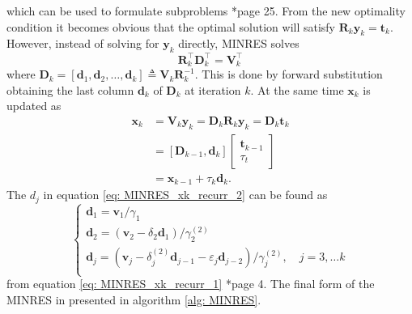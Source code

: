 which can be used to formulate subproblems \cite{ChoiSou-ChengTerrya2007Imfs}*{page 25}. From the new optimality condition it becomes obvious that the optimal solution will satisfy $\bm{R}_k \bm{y}_k = \bm{t}_k$. However, instead of solving for $\bm{y}_k$ directly, MINRES solves
\begin{equation}\label{eq: MINRES_xk_recurr_1}
    \bm{R}_{k}^{\intercal} \bm{D}_{k}^{\intercal} = \bm{V}_{k}^{\intercal}
\end{equation}
where $\bm{D}_{k} =
    \left[ \bm{d}_1 , \bm{d}_2 , \ldots , \bm{d}_k \right] \triangleq \bm{V}_k \bm{R}_k^{-1}$. This is done by forward substitution obtaining the last column $\bm{d}_k$ of $\bm{D}_k$ at iteration $k$. At the same time $\bm{x}_k$ is updated as
\begin{align} \label{eq: MINRES_xk_recurr_2}
    \bm{x}_k & = \bm{V}_k \bm{y}_k = \bm{D}_k \bm{R}_k \bm{y}_k = \bm{D}_k \bm{t}_k \nonumber \\
             & = \left[ \bm{D}_{k-1} , \bm{d}_k \right]
    \begin{bmatrix}
        \bm{t}_{k-1} \\ \tau_{t}
    \end{bmatrix} \nonumber                                                      \\
             & = \bm{x}_{k-1} + \tau_{k} \bm{d}_{k}.
\end{align}
The $d_j$ in equation \ref{eq: MINRES_xk_recurr_2} can be found as
\begin{equation*}
    \left\{
    \begin{array}{l}
        \bm{d}_1 = \bm{v}_1 / \gamma_1                                                                                                        \\
        \bm{d}_2 = \left( \bm{v}_2 - \delta_2 \bm{d}_1 \right) / \gamma_{2}^{(2)}                                                             \\
        \bm{d}_j = \left( \bm{v}_j - \delta_j^{(2)} \bm{d}_{j-1} -\varepsilon_{j} \bm{d}_{j-2} \right) / \gamma_{j}^{(2)}, \quad j=3,\ldots k \\
    \end{array}
    \right.
\end{equation*}
from equation \ref{eq: MINRES_xk_recurr_1}  \cite{CHOISou-ChengT2011MAKS}*{page 4}. The final form of the MINRES in presented in algorithm \ref{alg: MINRES}.

